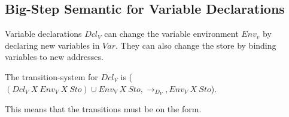 {%




\subsection{Big-Step Semantic for Variable Declarations}
Variable declarations $Dcl_V$ can change the variable environment $Env_v$ by declaring new variables in $Var$.
They can also change the store by binding variables to new addresses.

The transition-system for $Dcl_V$ is ($(Dcl_V\ X\ Env_V\ X\ Sto) \cup Env_V\ X\ Sto, \rightarrow_{D_{V}}, Env_V\ X\ Sto$).

This means that the transitions must be on the form.

}
